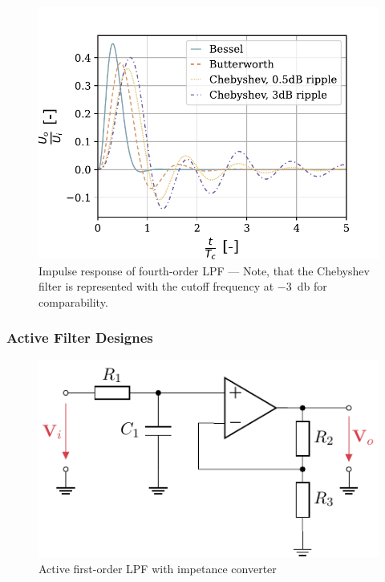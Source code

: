 \begin{figure}[!htb]
  \centering
  \includegraphics[scale=0.72]{figures/electronics/lowpass/lp_filter_4ord_imp}
  \caption[Impulse response of fourth-order \ac{LPF}]{Impulse response of fourth-order \ac{LPF} --- Note, that the Chebyshev filter is represented with the cutoff frequency at \SI{-3}{\decibel} for comparability.%
    \label{fig:lp_filter_4ord_imp}}
\end{figure}

\subsubsection{Active Filter Designes}

\begin{figure}[!htb]
  \centering
  \includegraphics[scale=0.9]{figures/electronics/lowpass/lp_active_1ord_imp_conv/lp_active_1ord_imp_conv}
  \caption[Active first-order \ac{LPF} with impetance converter]{Active first-order \ac{LPF} with impetance converter%
    \label{fig:lp_active_1ord_imp_conv}}
\end{figure}

